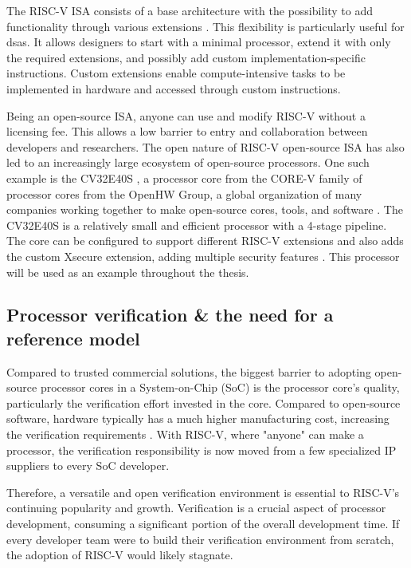 The RISC-V ISA consists of a base architecture with the possibility to add functionality through various extensions \cite{watermanRISCVInstructionSet2019}. This flexibility is particularly useful for \acrshort{dsa}s. It allows designers to start with a minimal processor, extend it with only the required extensions, and possibly add custom implementation-specific instructions. Custom extensions enable compute-intensive tasks to be implemented in hardware and accessed through custom instructions. 

Being an open-source ISA, anyone can use and modify RISC-V without a licensing fee. This allows a low barrier to entry and collaboration between developers and researchers. The open nature of RISC-V open-source ISA has also led to an increasingly large ecosystem of open-source processors. One such example is the CV32E40S \cite{openhwgroupCv32e40s2024}, a processor core from the CORE-V family of processor cores from the OpenHW Group, a global organization of many companies working together to make open-source cores, tools, and software \cite{taylorAdvancedRISCVVerification2023}. The CV32E40S is a relatively small and efficient processor with a 4-stage pipeline. The core can be configured to support different RISC-V extensions and also adds the custom Xsecure extension, adding multiple security features \cite{openhwgroupIntroductionCOREVCV32E40S2023}. This processor will be used as an example throughout the thesis.





\subsection{Processor verification \& the need for a reference model}

Compared to trusted commercial solutions, the biggest barrier to adopting open-source processor cores in a System-on-Chip (SoC) is the processor core's quality, particularly the verification effort invested in the core. Compared to open-source software, hardware typically has a much higher manufacturing cost, increasing the verification requirements \cite{kevinmcdermottOpenHWIndustrialGradeVerification2022}.
With RISC-V, where "anyone" can make a processor, the verification responsibility is now moved from a few specialized IP suppliers to every SoC developer. 

Therefore, a versatile and open verification environment is essential to RISC-V's continuing popularity and growth. Verification is a crucial aspect of processor development, consuming a significant portion of the overall development time. If every developer team were to build their verification environment from scratch, the adoption of RISC-V would likely stagnate.

